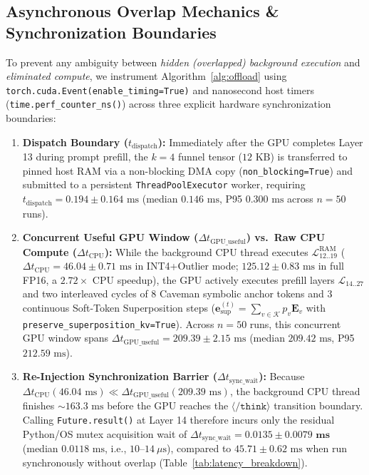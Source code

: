 \documentclass[10pt,twocolumn]{article}
\begin{document}
\subsection{Asynchronous Overlap Mechanics \& Synchronization Boundaries}
To prevent any ambiguity between \emph{hidden (overlapped) background execution} and \emph{eliminated compute}, we instrument Algorithm~\ref{alg:offload} using \texttt{torch.cuda.Event(enable\_timing=True)} and nanosecond host timers (\texttt{time.perf\_counter\_ns()}) across three explicit hardware synchronization boundaries:
\begin{enumerate}
    \item \textbf{Dispatch Boundary ($t_{\text{dispatch}}$):} Immediately after the GPU completes Layer 13 during prompt prefill, the $k=4$ funnel tensor ($12\text{ KB}$) is transferred to pinned host RAM via a non-blocking DMA copy (\texttt{non\_blocking=True}) and submitted to a persistent \texttt{ThreadPoolExecutor} worker, requiring $t_{\text{dispatch}} = 0.194 \pm 0.164\text{ ms}$ (median $0.146\text{ ms}$, P95 $0.300\text{ ms}$ across $n=50$ runs).
    \item \textbf{Concurrent Useful GPU Window ($\Delta t_{\text{GPU\_useful}}$) vs.\ Raw CPU Compute ($\Delta t_{\text{CPU}}$):} While the background CPU thread executes $\mathcal{L}_{12..19}^{\text{RAM}}$ ($\Delta t_{\text{CPU}} = 46.04 \pm 0.71\text{ ms}$ in INT4+Outlier mode; $125.12 \pm 0.83\text{ ms}$ in full FP16, a $\mathbf{2.72\times}$ CPU speedup), the GPU actively executes prefill layers $\mathcal{L}_{14..27}$ and two interleaved cycles of $8$ Caveman symbolic anchor tokens and $3$ continuous Soft-Token Superposition steps ($\mathbf{e}_{\text{sup}}^{(t)} = \sum_{v \in \mathcal{K}} p_v \mathbf{E}_v$ with \texttt{preserve\_superposition\_kv=True}). Across $n=50$ runs, this concurrent GPU window spans $\Delta t_{\text{GPU\_useful}} = 209.39 \pm 2.15\text{ ms}$ (median $209.42\text{ ms}$, P95 $212.59\text{ ms}$).
    \item \textbf{Re-Injection Synchronization Barrier ($\Delta t_{\text{sync\_wait}}$):} Because $\Delta t_{\text{CPU}} (46.04\text{ ms}) \ll \Delta t_{\text{GPU\_useful}} (209.39\text{ ms})$, the background CPU thread finishes $\sim 163.3\text{ ms}$ before the GPU reaches the $\langle\texttt{/think}\rangle$ transition boundary. Calling \texttt{Future.result()} at Layer 14 therefore incurs only the residual Python/OS mutex acquisition wait of $\Delta t_{\text{sync\_wait}} = \mathbf{0.0135 \pm 0.0079\text{ ms}}$ (median $0.0118\text{ ms}$, i.e., $10\text{--}14\ \mu\text{s}$), compared to $45.71 \pm 0.62\text{ ms}$ when run synchronously without overlap (Table~\ref{tab:latency_breakdown}).
\end{enumerate}
\end{document}
